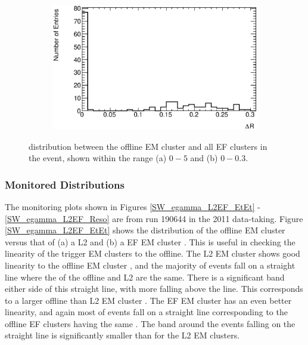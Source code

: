 \begin{figure}
\begin{subfigure}[b]{0.5\textwidth}
        \end{subfigure}%
        \begin{subfigure}[b]{0.5\textwidth}
                \centering
                \includegraphics[width=\textwidth]{figures/ServiceWork/EgammaEF/DR_Unmatched_Zoomed_EF.eps}
        \end{subfigure}%
\caption[\dr{} between offline and EF EM object]{
\dr{} distribution between the offline EM cluster and all EF clusters in the event, shown within the range (a) $0 - 5$ and (b) $0 - 0.3$. 
\label{SW_egamma_EF_dR}}
\end{figure}




\subsubsection{Monitored Distributions}


The monitoring plots shown in Figures \ref{SW_egamma_L2EF_EtEt} -\ref{SW_egamma_L2EF_Reso} are from run 190644 in the  2011 data-taking.
Figure \ref{SW_egamma_L2EF_EtEt} shows the distribution of the offline EM cluster \et{} versus that of (a) a L2 and (b) a EF EM cluster \et{}.
This is useful in checking the linearity of the trigger EM clusters to the offline. 
The L2 EM cluster \et{} shows good linearity to the offline EM cluster \et{}, and the majority of events fall on a straight line where the \et{} of the offline and L2 are the same.
There is a significant band either side of this straight line, with more falling above the line.
This corresponds to a larger offline \et{} than L2 EM cluster \et{}.
The EF EM cluster \et{} has an even better linearity, and again most of events fall on a straight line corresponding to the offline EF clusters having the same \et{}.
The band around the events falling on the straight line is significantly smaller than for the L2 EM clusters.


